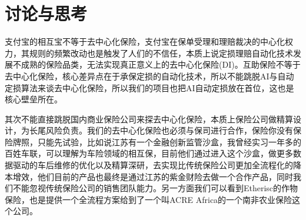 \documentclass{ctexart}
\begin{document}
\section{讨论与思考}

支付宝的相互宝不等于去中心化保险，支付宝在保单受理和理赔裁决的中心化权力，其规则的频繁改动也是触发了人们的不信任，本质上说定损理赔自动化技术发展不成熟的保险品类，无法实现真正意义上的去中心化保险(DI)。互助保险不等于去中心化保险，核心差异点在于承保定损的自动化技术，所以不能跳脱AI与自动定损算法来谈去中心化保险，所以我们的项目也把AI自动定损放在首位，这也是核心壁垒所在。

其次不能直接跳脱国内商业保险公司来探去中心化保险，本质上保险公司做精算设计，为长尾风险负责。我们的去中心化保险也必须与保司进行合作，保险你没有保险牌照，只能先试验，比如说江苏有一个金融创新监管沙盒，我曾经实习一年多的百姓车联，可以理解为车险领域的相互保，目前他们通过进入这个沙盒，做更多数据驱动的车后维修的优化以及精算深研，去实现比传统保险公司更加全流程化的降本增效，他们目前的产品也最终是通过江苏的紫金财险去做一个合作产品，同时我们不能忽视传统保险公司的销售团队能力。另一方面我们可以看到Etherisc的作物保险，也是提供一个全流程方案给到了一个叫ACRE Africa的一个南非农业保险这个公司。









\end{document}
